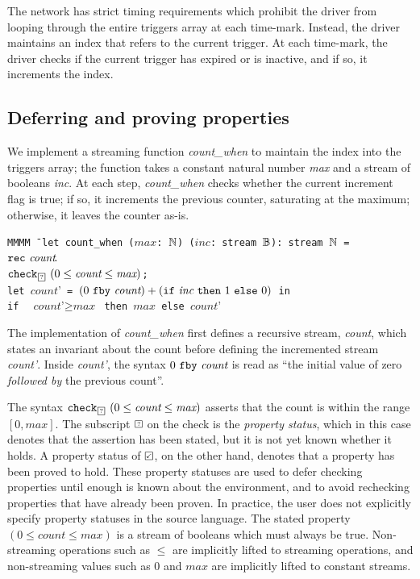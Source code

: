 \documentclass[a4paper,UKenglish,cleveref, autoref, thm-restate,anonymous]{lipics-v2021}
\begin{document}
The network has strict timing requirements which prohibit the driver from looping through the entire triggers array at each time-mark.
Instead, the driver maintains an index that refers to the current trigger.
At each time-mark, the driver checks if the current trigger has expired or is inactive, and if so, it increments the index.

\subsection{Deferring and proving properties}

We implement a streaming function \emph{count_when} to maintain the index into the triggers array; the function takes a constant natural number \emph{max} and a stream of booleans \emph{inc}.
At each step, \emph{count_when} checks whether the current increment flag is true; if so, it increments the previous counter, saturating at the maximum; otherwise, it leaves the counter as-is.

\begin{tabbing}
  \tt{MM}\= \tt{MM} \= \kill
  \tt{let} count_when ($\textit{max}$: $\NN$) ($\textit{inc}$: stream $\BB$): stream $\NN$ = \\
    \> $\tt{rec}~\rawbind{\textit{count}}{}$ \\
    \> \> $\xcheckP{\PSUnknown}{(0 \le \textit{count} \le \textit{max})}$; \\
    \> \> \tt{let} $\textit{count'}$ \tt{=} $(0~\tt{fby}~\textit{count}) + (\tt{if}~\textit{inc}~\tt{then}~1~\tt{else}~0)$ \tt{in} \\
    \> \> \tt{if } $\textit{count'} \ge \textit{max}$ \tt{then} $\textit{max}$  \tt{else} $\textit{count'}$
\end{tabbing}

The implementation of \emph{count_when} first defines a recursive stream, \emph{count}, which states an invariant about the count before defining the incremented stream \emph{count'}.
Inside \emph{count'}, the syntax $0~\tt{fby}~\textit{count}$ is read as ``the initial value of zero \emph{followed by} the previous count''.

The syntax $\xcheckP{\PSUnknown}{(0 \le \textit{count} \le \textit{max})}$ asserts that the count is within the range $[0, \textit{max}]$.
The subscript $\PSUnknown$ on the check is the \emph{property status}, which in this case denotes that the assertion has been stated, but it is not yet known whether it holds.
A property status of $\PSValid$, on the other hand, denotes that a property has been proved to hold.
These property statuses are used to defer checking properties until enough is known about the environment, and to avoid rechecking properties that have already been proven.
In practice, the user does not explicitly specify property statuses in the source language.
The stated property $(0 \le \textit{count} \le \textit{max})$ is a stream of booleans which must always be true.
Non-streaming operations such as $\le$ are implicitly lifted to streaming operations, and non-streaming values such as $0$ and $\textit{max}$ are implicitly lifted to constant streams.
\end{document}
